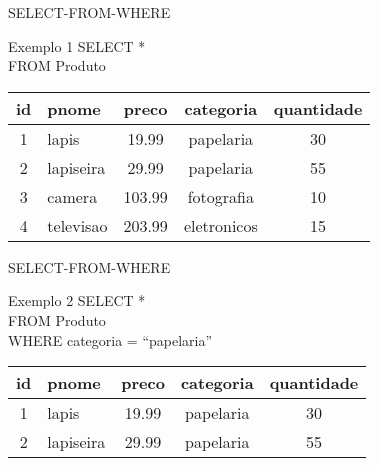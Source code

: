 \documentclass[aspectratio=169]{beamer}
\begin{document}
			\begin{frame}[fragile]{SELECT-FROM-WHERE}
				\begin{block}{Exemplo 1}
					{\ttfamily
						SELECT *\\
						FROM Produto
					}
				\end{block}
				\begin{table}
					\begin{tabular}{|c|l|c|c|c|}
						\toprule
						\textbf{id} & \textbf{pnome} & \textbf{preco} & \textbf{categoria} & \textbf{quantidade} \\ \midrule
						1      & lapis          &     19.99      &     papelaria      &         30          \\ \midrule
						2      & lapiseira      &     29.99      &     papelaria      &         55          \\ \midrule
						3      & camera         &     103.99     &     fotografia     &         10          \\ \midrule
						4      & televisao      &     203.99     &    eletronicos     &         15          \\ \bottomrule
					\end{tabular}
				\end{table}
			\end{frame}
			
			\begin{frame}[fragile]{SELECT-FROM-WHERE}
				\begin{block}{Exemplo 2}
					{\ttfamily
						SELECT *\\
						FROM Produto\\
						WHERE categoria = ``papelaria''
					}
				\end{block}
				\begin{table}
					\begin{tabular}{|c|l|c|c|c|}
						\toprule
						\textbf{id} & \textbf{pnome} & \textbf{preco} & \textbf{categoria} & \textbf{quantidade} \\ \midrule
						     1      & lapis          &     19.99      &     papelaria      &         30          \\ \midrule
						     2      & lapiseira      &     29.99      &     papelaria      &         55          \\ \bottomrule
					\end{tabular}
				\end{table}
			\end{frame}
		
\end{document}

